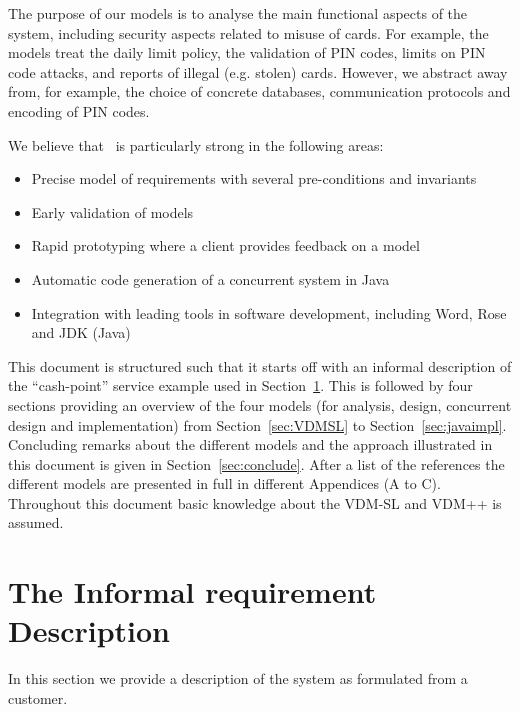 \documentclass[\pformat,12pt,twoside]{article}
\begin{document}
The purpose of our models is to analyse the main functional aspects 
of the system, including security aspects related to misuse of 
cards. For example, the models treat the daily limit policy, 
the validation of PIN codes, limits on PIN code attacks, and 
reports of illegal (e.g. stolen) cards. However, we abstract 
away from, for example, the choice of concrete databases, communication 
protocols and encoding of PIN codes. 

We believe that 
\vdmtools\ 
 is particularly strong in the 
following areas:
\begin{itemize}
\item 
Precise model of requirements with several pre-conditions and 
invariants
\item
Early validation of models
\item
Rapid prototyping where a client provides feedback on a model
\item
Automatic code generation of a concurrent system in Java
\item
Integration with leading tools in software development, including 
Word, Rose and JDK (Java)
\end{itemize}

This document is structured such that it starts off with an informal
description of the ``cash-point'' service example used in
Section~\ref{sec:req}. This is followed by four sections providing an
overview of the four models (for analysis, design, concurrent design and
implementation) from Section~\ref{sec:VDMSL} to
Section~\ref{sec:javaimpl}. Concluding remarks about the different
models and the approach illustrated in this document is given in
Section~\ref{sec:conclude}. After a list of the references the
different models are presented in full in different Appendices (A to
C). Throughout this document basic knowledge about the VDM-SL
\cite{ISOVDM96,Fitzgerald&98b} and VDM++ \cite{LangManPP,Guidelines}
is assumed.

\section{The Informal requirement Description}\label{sec:req}

In this section we provide a description of the system as formulated
from a customer.
\end{document}
